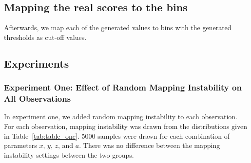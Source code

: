 \documentclass[titlepage, a4paper, 11pt]{article}
\begin{document}
\subsection{Mapping the real scores to the bins}
Afterwards, we map each of the generated values to bins with the generated thresholds as cut-off values. 

\subsection{Experiments}
\subsubsection{Experiment One: Effect of Random Mapping Instability on All Observations}
In experiment one, we added random mapping instability to each observation. For each observation, mapping instability was drawn from the distributions given in Table~\ref{tab:table_one}. 5000 samples were drawn for each combination of parameters $x$, $y$, $z$, and $a$. There was no difference between the mapping instability settings between the two groups. 

\begin{table}
    \centering
    \caption{An overview of the settings for the simulation parameters for the first experiment. Each row corresponds to a different concept, with the second column indicating the variable in equations affected by the distribution, and the third column listing the parameters of the distribution. The first column represents the concept that the variable has to represent. The second column is the variable that is being set using the distribution. Note that threshold instability has a pretty specific implementation (see step 4 of the threshold generation section).}
    \label{tab:table_one}
\end{table}
\end{document}
